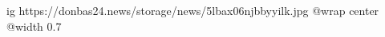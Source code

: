 
 
 
 
 

\ifcmt
  ig https://donbas24.news/storage/news/5lbax06njbbyyilk.jpg
  @wrap center
  @width 0.7
\fi
